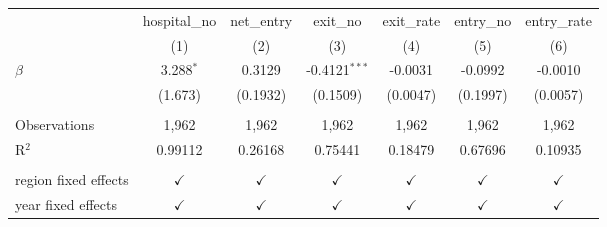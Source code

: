 \begingroup
\centering
\begin{tabular}{lcccccc}
   \toprule
                        & hospital\_no  & net\_entry    & exit\_no        & exit\_rate    & entry\_no     & entry\_rate\\   
                        & (1)           & (2)           & (3)             & (4)           & (5)           & (6)\\  
   \midrule 
   $\beta$              & 3.288$^{*}$   & 0.3129        & -0.4121$^{***}$ & -0.0031       & -0.0992       & -0.0010\\   
                        & (1.673)       & (0.1932)      & (0.1509)        & (0.0047)      & (0.1997)      & (0.0057)\\   
    \\
   Observations         & 1,962         & 1,962         & 1,962           & 1,962         & 1,962         & 1,962\\  
   R$^2$                & 0.99112       & 0.26168       & 0.75441         & 0.18479       & 0.67696       & 0.10935\\  
    \\
   region fixed effects & $\checkmark$  & $\checkmark$  & $\checkmark$    & $\checkmark$  & $\checkmark$  & $\checkmark$\\   
   year fixed effects   & $\checkmark$  & $\checkmark$  & $\checkmark$    & $\checkmark$  & $\checkmark$  & $\checkmark$\\   
   \bottomrule
\end{tabular}
\par\endgroup
